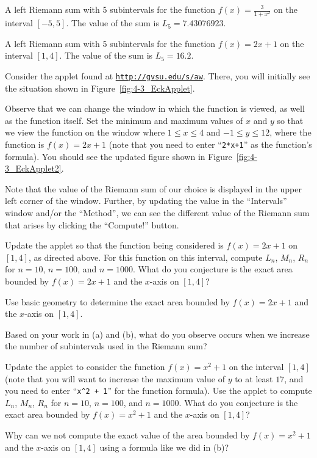 \begin{marginfigure}[1cm] %
\caption{A left Riemann sum with 5 subintervals for the function $f(x) = \frac{3}{1+x^2}$ on the interval $[-5,5]$.  The value of the sum is $L_5 = 7.43076923$.} \label{fig:4-3_EckApplet}
\end{marginfigure}

\begin{marginfigure}[1cm] %
\caption{A left Riemann sum with 5 subintervals for the function $f(x) = 2x+1$ on the interval $[1,4]$.  The value of the sum is $L_5 = 16.2$.} \label{fig:4-3_EckApplet2}
\end{marginfigure}

\begin{pa} \label{PA:4.3}
Consider the applet found at \href{http://gvsu.edu/s/aw}{\texttt{http://gvsu.edu/s/aw}}.  There, you will initially see the situation shown in Figure~\ref{fig:4-3_EckApplet}.

Observe that we can change the window in which the function is viewed, as well as the function itself.  Set the minimum and maximum values of $x$ and $y$ so that we view the function on the window where $1 \le x \le 4$ and $-1 \le y \le 12$, where the function is $f(x) = 2x + 1$ (note that you need to enter ``\texttt{2*x+1}'' as the function's formula).  You should see the updated figure shown in Figure~\ref{fig:4-3_EckApplet2}.

Note that the value of the Riemann sum of our choice is displayed in the upper left corner of the window.  Further, by updating the value in the ``Intervals'' window and/or the ``Method'', we can see the different value of the Riemann sum that arises by clicking the ``Compute!'' button.
\ba
	\item Update the applet so that the function being considered is $f(x) = 2x+1$ on $[1,4]$, as directed above.  For this function on this interval, compute $L_{n}$, $M_{n}$,  $R_{n}$ for $n = 10$, $n = 100$, and $n = 1000$.  What do you conjecture is the exact area bounded by $f(x) = 2x+1$ and the $x$-axis on $[1,4]$?
	\item Use basic geometry to determine the exact area bounded by $f(x) = 2x+1$ and the $x$-axis on $[1,4]$.
	\item Based on your work in (a) and (b), what do you observe occurs when we increase the number of subintervals used in the Riemann sum?
	\item Update the applet to consider the function $f(x) = x^2 + 1$ on the interval $[1,4]$ (note that you will want to increase the maximum value of $y$ to at least $17$, and you need to enter ``\texttt{x\^{}2 + 1}'' for the function formula).  Use the applet to compute $L_{n}$, $M_{n}$,  $R_{n}$ for $n = 10$, $n = 100$, and $n = 1000$.  What do you conjecture is the exact area bounded by $f(x) = x^2+1$ and the $x$-axis on $[1,4]$?
	\item Why can we not compute the exact value of the area bounded by $f(x) = x^2+1$ and the $x$-axis on $[1,4]$ using a formula like we did in (b)?
\ea
\end{pa} 
\afterpa